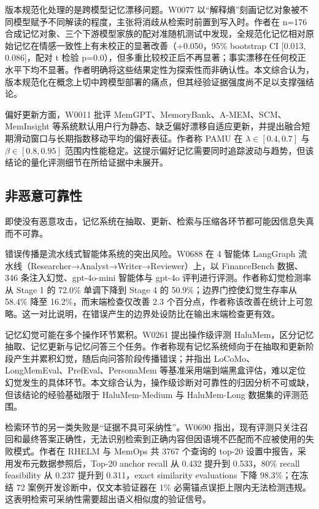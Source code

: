 版本规范化处理的是跨模型记忆漂移问题。W0077 以“解释熵”刻画记忆对象被不同模型赋予不同解读的程度，主张将消歧从检索时前置到写入时。作者在 n=176 合成记忆对象、三个下游模型家族的配对准随机测试中发现，全规范化记忆相对原始记忆在情感一致性上有未校正的显著改善（+0.050，95\% bootstrap CI [0.013, 0.086]，配对 t 检验 p=0.0），但多重比较校正后不再显著；事实漂移在任何校正水平下均不显著。作者明确将这些结果定性为探索性而非确认性\cite{W0077}。本文综合认为，版本规范化在概念上切中跨模型部署的痛点，但其经验证据强度尚不足以支撑强结论。

偏好更新方面，W0011 批评 MemGPT、MemoryBank、A-MEM、SCM、MemInsight 等系统默认用户行为静态、缺乏偏好漂移自适应更新，并提出融合短期滑动窗口与长期指数移动平均的偏好表征。作者称 PAMU 在 $\lambda \in [0.4, 0.7]$ 与 $\beta \in [0.8, 0.95]$ 范围内性能稳定\cite{W0011}。这提示偏好记忆需要同时追踪波动与趋势，但该结论的量化评测细节在所给证据中未展开。

\subsection{非恶意可靠性}

即使没有恶意攻击，记忆系统在抽取、更新、检索与压缩各环节都可能因信息失真而不可靠。

错误传播是流水线式智能体系统的突出风险。W0688 在 4 智能体 LangGraph 流水线（Researcher→Analyst→Writer→Reviewer）上，以 FinanceBench 数据、346 条注入幻觉、gpt-4o-mini 智能体与 gpt-4o 评判进行评测。作者称幻觉检测率从 Stage 1 的 72.0\% 单调下降到 Stage 4 的 50.9\%；边界门控使幻觉生存率从 58.4\% 降至 16.2\%，而末端检查仅改善 2.3 个百分点，作者称该改善在统计上可忽略\cite{W0688}。这一对比说明，在错误产生的边界处设防比在输出末端检查更有效。

记忆幻觉可能在多个操作环节累积。W0261 提出操作级评测 HaluMem，区分记忆抽取、记忆更新与记忆问答三个任务。作者称现有记忆系统倾向于在抽取和更新阶段产生并累积幻觉，随后向问答阶段传播错误；并指出 LoCoMo、LongMemEval、PrefEval、PersonaMem 等基准采用端到端黑盒评估，难以定位幻觉发生的具体环节\cite{W0261}。本文综合认为，操作级诊断对可靠性的归因分析不可或缺，但该结论的经验基础限于 HaluMem-Medium 与 HaluMem-Long 数据集的评测范围。

检索环节的另一类失败是“证据不具可采纳性”。W0690 指出，现有评测只关注召回和最终答案正确性，无法识别检索到正确内容但因语境不匹配而不应被使用的失败模式。作者在 RHELM 与 MemOps 共 3767 个查询的 top-20 设置中报告，采用发布元数据参照后，Top-20 anchor recall 从 0.432 提升到 0.533，80\% recall feasibility 从 0.237 提升到 0.311，exact similarity evaluations 下降 98.3\%；在冻结 72 案例开发诊断中，仅文本验证器在 1\% 必需锚点误拒上限内无法检测违规\cite{W0690}。这表明检索可采纳性需要超出语义相似度的验证信号。

